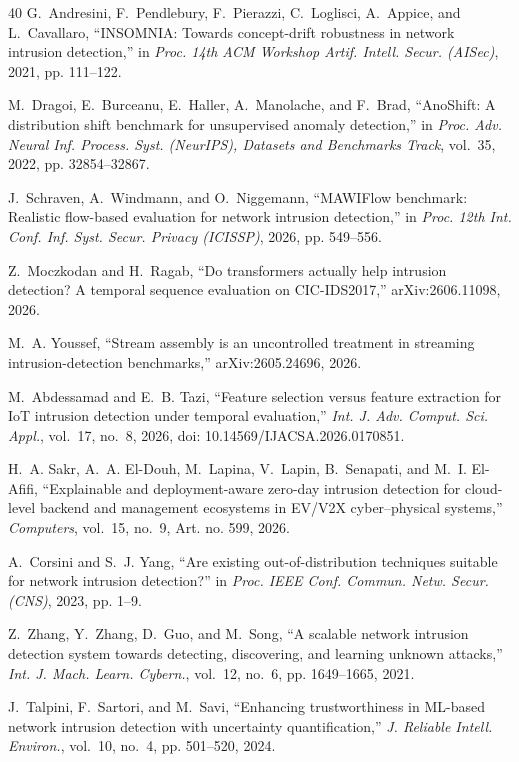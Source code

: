 \begin{thebibliography}{40}
G.~Andresini, F.~Pendlebury, F.~Pierazzi, C.~Loglisci, A.~Appice, and L.~Cavallaro, ``INSOMNIA: Towards concept-drift robustness in network intrusion detection,'' in \emph{Proc. 14th ACM Workshop Artif. Intell. Secur. (AISec)}, 2021, pp. 111--122.

M.~Dragoi, E.~Burceanu, E.~Haller, A.~Manolache, and F.~Brad, ``AnoShift: A distribution shift benchmark for unsupervised anomaly detection,'' in \emph{Proc. Adv. Neural Inf. Process. Syst. (NeurIPS), Datasets and Benchmarks Track}, vol.~35, 2022, pp. 32854--32867.

J.~Schraven, A.~Windmann, and O.~Niggemann, ``MAWIFlow benchmark: Realistic flow-based evaluation for network intrusion detection,'' in \emph{Proc. 12th Int. Conf. Inf. Syst. Secur. Privacy (ICISSP)}, 2026, pp. 549--556.

Z.~Moczkodan and H.~Ragab, ``Do transformers actually help intrusion detection? A temporal sequence evaluation on CIC-IDS2017,'' arXiv:2606.11098, 2026.

M.~A. Youssef, ``Stream assembly is an uncontrolled treatment in streaming intrusion-detection benchmarks,'' arXiv:2605.24696, 2026.

M.~Abdessamad and E.~B. Tazi, ``Feature selection versus feature extraction for IoT intrusion detection under temporal evaluation,'' \emph{Int. J. Adv. Comput. Sci. Appl.}, vol.~17, no.~8, 2026, doi: 10.14569/IJACSA.2026.0170851.

H.~A. Sakr, A.~A. El-Douh, M.~Lapina, V.~Lapin, B.~Senapati, and M.~I. El-Afifi, ``Explainable and deployment-aware zero-day intrusion detection for cloud-level backend and management ecosystems in EV/V2X cyber--physical systems,'' \emph{Computers}, vol.~15, no.~9, Art. no. 599, 2026.

A.~Corsini and S.~J. Yang, ``Are existing out-of-distribution techniques suitable for network intrusion detection?'' in \emph{Proc. IEEE Conf. Commun. Netw. Secur. (CNS)}, 2023, pp. 1--9.

Z.~Zhang, Y.~Zhang, D.~Guo, and M.~Song, ``A scalable network intrusion detection system towards detecting, discovering, and learning unknown attacks,'' \emph{Int. J. Mach. Learn. Cybern.}, vol.~12, no.~6, pp. 1649--1665, 2021.

J.~Talpini, F.~Sartori, and M.~Savi, ``Enhancing trustworthiness in ML-based network intrusion detection with uncertainty quantification,'' \emph{J. Reliable Intell. Environ.}, vol.~10, no.~4, pp. 501--520, 2024.


\end{thebibliography}
